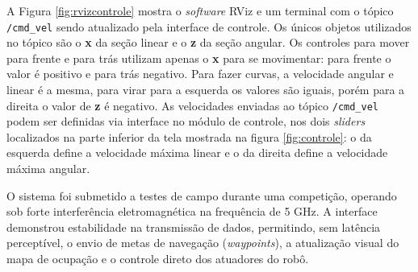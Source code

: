 
A Figura \ref{fig:rvizcontrole} mostra o \textit{software} RViz e um terminal com o tópico \texttt{/cmd\_vel} sendo atualizado pela interface de controle. Os únicos objetos utilizados no tópico são o \textbf{x} da seção linear e o \textbf{z} da seção angular. Os controles para mover para frente e para trás utilizam apenas o \textbf{x} para se movimentar: para frente o valor é positivo e para trás negativo. Para fazer curvas, a velocidade angular e linear é a mesma, para virar para a esquerda os valores são iguais, porém para a direita o valor de \textbf{z} é negativo. As velocidades enviadas ao tópico \texttt{/cmd\_vel} podem ser definidas via interface no módulo de controle, nos dois \textit{sliders} localizados na parte inferior da tela mostrada na figura \ref{fig:controle}: o da esquerda define a velocidade máxima linear e o da direita define a velocidade máxima angular.

O sistema foi submetido a testes de campo durante uma competição, operando sob forte interferência eletromagnética na frequência de 5 GHz. A interface demonstrou estabilidade na transmissão de dados, permitindo, sem latência perceptível, o envio de metas de navegação (\textit{waypoints}), a atualização visual do mapa de ocupação e o controle direto dos atuadores do robô.